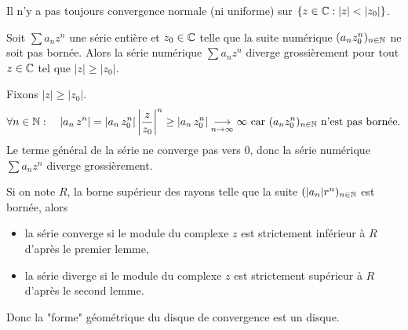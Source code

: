 \documentclass{book}
\begin{document}
\begin{Remarque} Il n'y a pas toujours convergence normale (ni uniforme) sur $\{z\in \C:|z|<|z_0|\}$.
\end{Remarque}
\begin{Lemme}
Soit $\sum a_n z^n$ une série entière et $z_0\in \mathbb{C}$ telle que la suite numérique $(a_n z_0^n)_{n\in \mathbb{N} }$ ne soit pas bornée.
Alors la série numérique $\sum a_n z^n$ diverge grossièrement pour tout $z\in \mathbb{C}$ tel que $|z| \geq |z_0|$.
\end{Lemme}
\begin{Demonstration}
Fixons $|z|\geq  |z_{0}|$.\\
$$ \forall n\in \N: \quad |a_{n}\,z^{n}|=\left|a_{n}\,z_{0}^{n}\right|\left|\frac {z}{z_{0}}\right|^{n}\geq\left|a_{n}\,z_{0}^{n}\right|\tend[n\to\infty]\infty\text{ car }(a_n z_0^n)_{n\in \N }\text{ n'est pas bornée}.$$
Le terme général de la série ne converge  pas vers 0, donc la série numérique $\sum a_n z^n$ diverge grossièrement.
\end{Demonstration}
Si on note $R$, la borne supérieur des rayons telle que la suite $(|a_n| r^n)_{n\in\mathbb{N}}$ est bornée, alors 
\begin{itemize}
\item la série converge si le module du complexe $z$  est  strictement inférieur à $R$ d'après le premier lemme,
\item la série diverge  si le module du complexe $z$  est  strictement supérieur à $R$ d'après le second lemme.
\end{itemize}
Donc la "forme" géométrique du disque de convergence est un disque.
\end{document}
